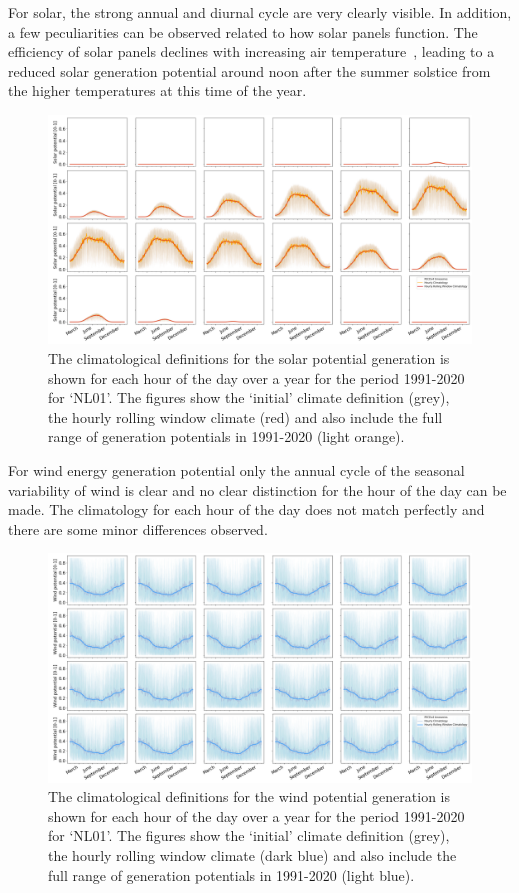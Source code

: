 \documentclass[a4paper,11pt]{extarticle}
\begin{document}
For solar, the strong annual and diurnal cycle are very clearly visible. 
In addition, a few peculiarities can be observed related to how solar panels function. 
The efficiency of solar panels declines with increasing air temperature~\parencite{SaintDrenan2018}, leading to a reduced solar generation potential around noon after the summer solstice from the higher temperatures at this time of the year. 
\begin{figure}[hb]
    \centering
    \includegraphics[width=\textwidth]{climatology_solar_hourly}
    \caption{
    The climatological definitions for the solar potential generation is shown for each hour of the day over a year for the period 1991-2020 for `NL01'. 
    The figures show the `initial' climate definition (grey), the hourly rolling window climate (red) and also include the full range of generation potentials in 1991-2020 (light orange). }
    \label{SIfig:climate_solar_hourly}
\end{figure}

For wind energy generation potential only the annual cycle of the seasonal variability of wind is clear and no clear distinction for the hour of the day can be made. 
The climatology for each hour of the day does not match perfectly and there are some minor differences observed.
\begin{figure}[ht]
    \centering
    \includegraphics[width=\textwidth]{climatology_wind_hourly}
    \caption{
    The climatological definitions for the wind potential generation is shown for each hour of the day over a year for the period 1991-2020 for `NL01'. 
    The figures show the `initial' climate definition (grey), the hourly rolling window climate (dark blue) and also include the full range of generation potentials in 1991-2020 (light blue). }
    \label{SIfig:climate_wind_hourly}
\end{figure}
\end{document}
